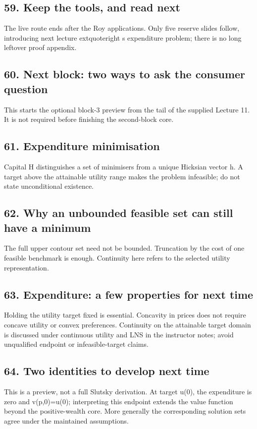 \documentclass[11pt,a4paper]{article}
\begin{document}
\subsection*{59. Keep the tools, and read next}
The live route ends after the Roy applications. Only five reserve slides follow, introducing next lecture	extquoteright s expenditure problem; there is no long leftover proof appendix.

\subsection*{60. Next block: two ways to ask the consumer question}
This starts the optional block-3 preview from the tail of the supplied Lecture 11. It is not required before finishing the second-block core.

\subsection*{61. Expenditure minimisation}
Capital H distinguishes a set of minimisers from a unique Hicksian vector h. A target above the attainable utility range makes the problem infeasible; do not state unconditional existence.

\subsection*{62. Why an unbounded feasible set can still have a minimum}
The full upper contour set need not be bounded. Truncation by the cost of one feasible benchmark is enough. Continuity here refers to the selected utility representation.

\subsection*{63. Expenditure: a few properties for next time}
Holding the utility target fixed is essential. Concavity in prices does not require concave utility or convex preferences. Continuity on the attainable target domain is discussed under continuous utility and LNS in the instructor notes; avoid unqualified endpoint or infeasible-target claims.

\subsection*{64. Two identities to develop next time}
This is a preview, not a full Slutsky derivation. At target u(0), the expenditure is zero and v(p,0)=u(0); interpreting this endpoint extends the value function beyond the positive-wealth core. More generally the corresponding solution sets agree under the maintained assumptions.
\end{document}
